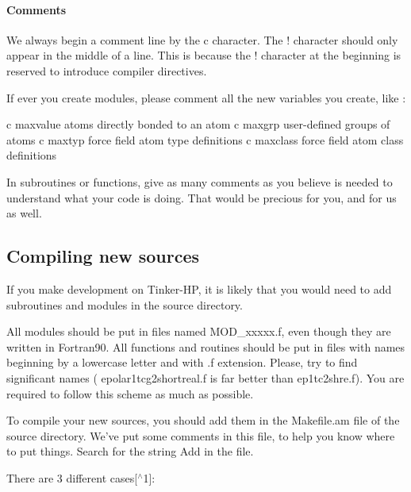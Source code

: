 \paragraph*{Comments}

We always begin a comment line by the {\ttfamily c} character. The {\ttfamily !} character should only appear in the middle of a line. This is because the {\ttfamily !} character at the beginning is reserved to introduce compiler directives.

If ever you create modules, please comment all the new variables you create, like \-: \begin{DoxyVerb}   c     maxvalue        atoms directly bonded to an atom
   c     maxgrp          user-defined groups of atoms
   c     maxtyp          force field atom type definitions
   c     maxclass        force field atom class definitions
\end{DoxyVerb}


In subroutines or functions, give as many comments as you believe is needed to understand what your code is doing. That would be precious for you, and for us as well.

\subsection*{Compiling new sources}

If you make development on Tinker-\/\-H\-P, it is likely that you would need to add subroutines and modules in the source directory.

All modules should be put in files named {\ttfamily M\-O\-D\-\_\-xxxxx.\-f}, even though they are written in Fortran90. All functions and routines should be put in files with names beginning by a lowercase letter and with {\ttfamily .f} extension. Please, try to find significant names ( {\ttfamily epolar1tcg2shortreal.\-f} is far better than {\ttfamily ep1tc2shre.\-f}). You are required to follow this scheme as much as possible.

To compile your new sources, you should add them in the {\ttfamily Makefile.\-am} file of the {\ttfamily source} directory. We’ve put some comments in this file, to help you know where to put things. Search for the string {\ttfamily Add} in the file.

There are 3 different cases\mbox{[}$^\wedge$1\mbox{]}\-:



